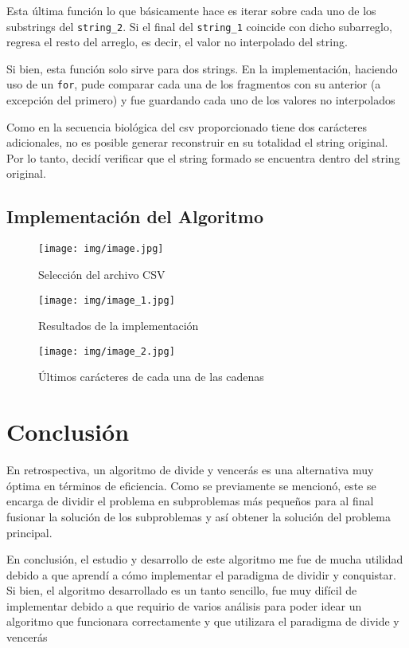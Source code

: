 \documentclass[12pt, a4paper]{article} %
\begin{document}
Esta última función lo que básicamente hace es iterar sobre cada uno de los substrings del \texttt{string\_2}. Si el final del \texttt{string\_1} coincide con dicho subarreglo, regresa el resto del arreglo, es decir, el valor no interpolado del string.

Si bien, esta función solo sirve para dos strings. En la implementación, haciendo uso de un \texttt{for}, pude comparar cada una de los fragmentos con su anterior (a excepción del primero) y fue guardando cada uno de los valores no interpolados

\begin{tcolorbox}[colback=yellow!10!white,colframe=red!75!black,title=Importante]
	Como en la secuencia biológica del csv proporcionado tiene dos carácteres adicionales, no es posible generar reconstruir en su totalidad el string original. Por lo tanto, decidí verificar que el string formado se encuentra dentro del string original. 
\end{tcolorbox}

\subsection{Implementación del Algoritmo}

\begin{figure}[h]
	\centering
	\texttt{[image: img/image.jpg]}
	\caption{Selección del archivo CSV}
\end{figure}

\begin{figure}[h]
	\centering
	\texttt{[image: img/image\_1.jpg]}
	\caption{Resultados de la implementación}
\end{figure}

\begin{figure}[h]
	\centering
	\texttt{[image: img/image\_2.jpg]}
	\caption{Últimos carácteres de cada una de las cadenas}
\end{figure}

\clearpage
\section{Conclusión}

En retrospectiva, un algoritmo de divide y vencerás es una alternativa muy óptima en términos de eficiencia. Como se previamente se mencionó, este se encarga de dividir el problema en subproblemas más pequeños para al final fusionar la solución de los subproblemas y así obtener la solución del problema principal.

En conclusión, el estudio y desarrollo de este algoritmo me fue de mucha utilidad debido a que aprendí a cómo implementar el paradigma de dividir y conquistar. Si bien, el algoritmo desarrollado es un tanto sencillo, fue muy difícil de implementar debido a que requirio de varios análisis para poder idear un algoritmo que funcionara correctamente y que utilizara el paradigma de divide y vencerás

\nocite{*} %

\clearpage


\end{document}
